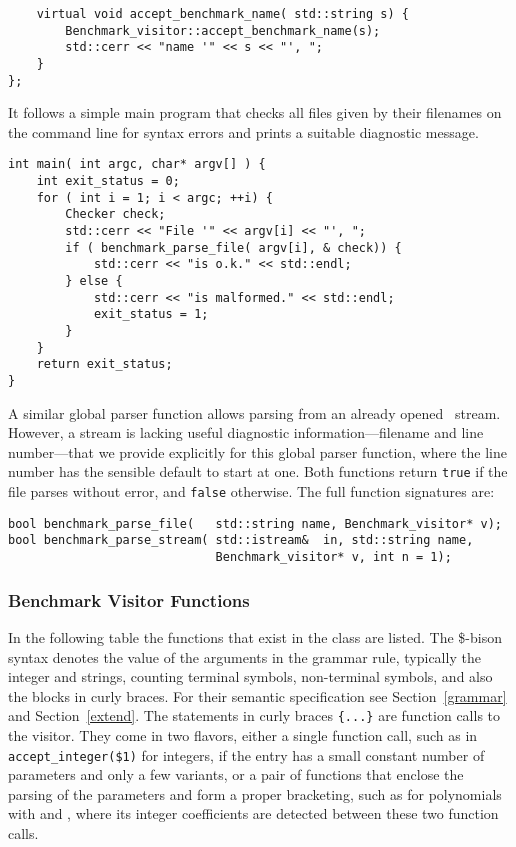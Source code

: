 \begin{verbatim}
    virtual void accept_benchmark_name( std::string s) {
        Benchmark_visitor::accept_benchmark_name(s);
        std::cerr << "name '" << s << "', ";
    }
};
\end{verbatim}

\noindent
It follows a simple main program that checks all files given by their
filenames on the command line for syntax errors and prints a suitable
diagnostic message.

\begin{verbatim}
int main( int argc, char* argv[] ) {
    int exit_status = 0;
    for ( int i = 1; i < argc; ++i) {
        Checker check;
        std::cerr << "File '" << argv[i] << "', ";
        if ( benchmark_parse_file( argv[i], & check)) {
            std::cerr << "is o.k." << std::endl;
        } else {
            std::cerr << "is malformed." << std::endl;
            exit_status = 1;
        }
    }
    return exit_status;
}
\end{verbatim}

\noindent
A similar global parser function allows parsing from an already opened
\CC\ stream. However, a stream is lacking useful diagnostic
information---filename and line number---that we provide explicitly
for this global parser function, where the line number has the
sensible default to start at one. Both functions return \texttt{true}
if the file parses without error, and \texttt{false} otherwise. The
full function signatures are:

\begin{verbatim}
bool benchmark_parse_file(   std::string name, Benchmark_visitor* v);
bool benchmark_parse_stream( std::istream&  in, std::string name, 
                             Benchmark_visitor* v, int n = 1);
\end{verbatim}


\subsubsection{Benchmark Visitor Functions}
\label{functions}

In the following table the functions that exist in the
 class are listed.  The \$-bison syntax
denotes the value of the arguments in the grammar rule, typically the
integer and strings, counting terminal symbols, non-terminal symbols,
and also the blocks in curly braces.  For their semantic specification
see Section~\ref{grammar} and Section~\ref{extend}.  The statements in
curly braces 
\texttt{\{...\}}
are function calls to the visitor.
They come in two flavors, either a single function call, such as in
\texttt{accept\_integer(\$1)} for integers, if the entry has a small
constant number of parameters and only a few variants, or a pair of
functions that enclose the parsing of the parameters and form a proper
bracketing, such as for polynomials with
 and ,
where its integer coefficients are detected between these two function
calls. 

